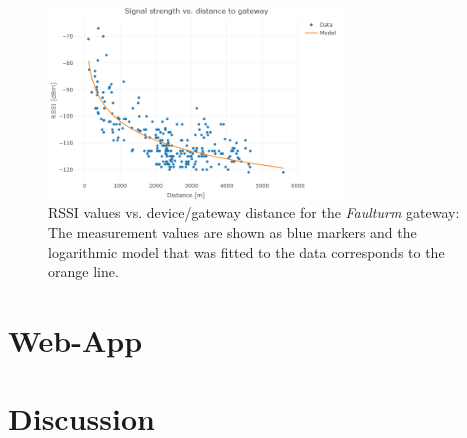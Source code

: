 \begin{figure}[h!]
\centering
\includegraphics[width=0.7\textwidth]{figures/loglaw}
\caption{RSSI values vs. device/gateway distance for the \emph{Faulturm} gateway: The measurement values are shown as blue markers and the logarithmic model that was fitted to the data corresponds to the orange line.}\label{fig:law}
\end{figure}

\section{Web-App}\label{sec:app}

\section{Discussion}\label{sec:disc}





